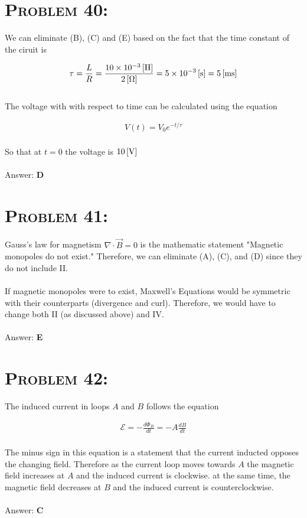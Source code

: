 \documentclass{article}
\providecommand{\e}[1]{\ensuremath{\times 10^{#1}}}
\begin{document}

\section{\textsc{Problem 40:}} We can eliminate (B), (C) and (E) based on the fact that the time constant of the ciruit is

\begin{gather}
\tau = \frac{L}{R} = \frac{\unit[10\e{-3}]{[H]}}{\unit[2]{[\Omega]}} = \unit[5\e{-3}]{[s]} = \unit[5]{[ms]}
\end{gather}
\\
The voltage with with respect to time can be calculated using the equation

\begin{gather}
V(t) = V_{0} e^{-t/\tau}
\end{gather}
\\
So that at $t=0$ the voltage is $\unit[10]{[V]}$
\\\\
Answer: \textbf{\textcolor{ProcessBlue}D}\\


\section{\textsc{Problem 41:}} Gauss's law for magnetism $\nabla \cdot \vec{B} = 0$ is the mathematic statement "Magnetic monopoles do not exist." Therefore, we can eliminate (A), (C), and (D) since they do not include II.\\
\\
If magnetic monopoles were to exist, Maxwell's Equations would be symmetric with their counterparts (divergence and curl). Therefore, we would have to change both II (as discussed above) and IV.
\\\\
Answer: \textbf{\textcolor{ProcessBlue}E}\\


\section{\textsc{Problem 42:}} The induced current in loops $A$ and $B$ follows the equation

\begin{gather}
\mathcal{E} = -\frac{d \Phi_{B}}{d t} = -A \frac{d B}{dt}
\end{gather}
\\
The minus sign in this equation is a statement that the current inducted opposes the changing field. Therefore as the current loop moves towards $A$ the magnetic field increases at $A$ and the induced current is clockwise. at the same time, the magnetic field decreases at $B$ and the induced current is counterclockwise.
\\\\
Answer: \textbf{\textcolor{ProcessBlue}C}\\
\end{document}
